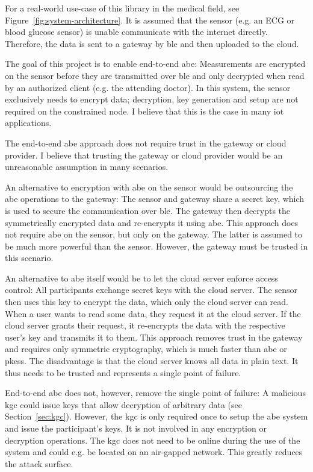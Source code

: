 For a real-world use-case of this library in the medical field, see Figure~\ref{fig:system-architecture}.
It is assumed that the sensor (e.g. an ECG or blood glucose sensor) is unable communicate with the internet directly.
Therefore, the data is sent to a gateway by \acrfull{ble} and then uploaded to the cloud.

The goal of this project is to enable end-to-end \acrlong{abe}:
Measurements are encrypted on the sensor before they are transmitted over \acrshort{ble} and only decrypted when read by an authorized client (e.g. the attending doctor).
In this system, the sensor exclusively needs to encrypt data; decryption, key generation and setup are not required on the constrained node.
I believe that this is the case in many \acrshort{iot} applications.

The end-to-end \acrshort{abe} approach does not require trust in the gateway or cloud provider.
I believe that trusting the gateway or cloud provider would be an unreasonable assumption in many scenarios.

An alternative to encryption with \acrshort{abe} on the sensor would be outsourcing the \acrshort{abe} operations to the gateway:
The sensor and gateway share a secret key, which is used to secure the communication over \acrshort{ble}.
The gateway then decrypts the symmetrically encrypted data and re-encrypts it using \acrshort{abe}.
This approach does not require \acrshort{abe} on the sensor, but only on the gateway.
The latter is assumed to be much more powerful than the sensor.
However, the gateway must be trusted in this scenario.

An alternative to \acrshort{abe} itself would be to let the cloud server enforce access control:
All participants exchange secret keys with the cloud server.
The sensor then uses this key to encrypt the data, which only the cloud server can read.
When a user wants to read some data, they request it at the cloud server.
If the cloud server grants their request, it re-encrypts the data with the respective user's key and transmits it to them.
This approach removes trust in the gateway and requires only symmetric cryptography, which is much faster than \acrshort{abe} or \glspl{pkes}.
The disadvantage is that the cloud server knows all data in plain text. It thus needs to be trusted and represents a single point of failure.

End-to-end \acrshort{abe} does not, however, remove the single point of failure:
A malicious \acrfull{kgc} could issue keys that allow decryption of arbitrary data (see Section~\ref{sec:kgc}).
However, the \acrfull{kgc} is only required once to setup the \acrshort{abe} system and issue the participant's keys.
It is not involved in any encryption or decryption operations.
The \acrshort{kgc} does not need to be online during the use of the system and could e.g. be located on an air-gapped network. 
This greatly reduces the attack surface.
~\\

